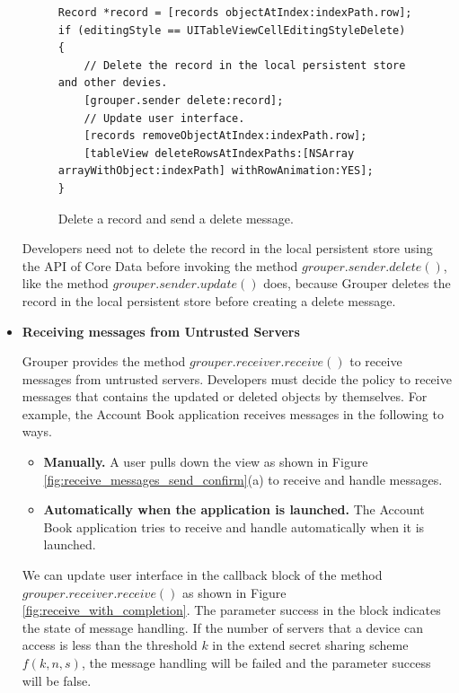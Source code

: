 \documentclass[a4paper,11pt]{report}
\begin{document}
\begin{itemize}
\begin{figure}
\begin{lstlisting}[frame=none language=Objective-C] 
Record *record = [records objectAtIndex:indexPath.row];
if (editingStyle == UITableViewCellEditingStyleDelete) {
    // Delete the record in the local persistent store and other devies.
    [grouper.sender delete:record];
    // Update user interface.
    [records removeObjectAtIndex:indexPath.row];
    [tableView deleteRowsAtIndexPaths:[NSArray arrayWithObject:indexPath] withRowAnimation:YES];
}	
\end{lstlisting}
\caption{Delete a record and send a delete message.}
\label{fig:delete_record}
\end{figure}

Developers need not to delete the record in the local persistent store using the API of Core Data before invoking the method $grouper.sender.delete()$,  like the method $grouper.sender.update()$ does, because Grouper deletes the record in the local persistent store before creating a delete message.
\\

\item \textbf{Receiving messages from Untrusted Servers}

Grouper provides the method $grouper.receiver.receive()$ to receive messages from untrusted servers.
Developers must decide the policy to receive messages that contains the updated or deleted objects by themselves.
For example, the Account Book application receives messages in the following to ways.

\begin{itemize}[leftmargin=7mm]
	\setlength{\itemsep}{1pt}
	\setlength{\parskip}{0pt}
	\setlength{\parsep}{0pt}
	\item \textbf{Manually.}
	A user pulls down the view as shown in Figure \ref{fig:receive_messages_send_confirm}(a) to receive and handle messages.
	\item \textbf{Automatically when the application is launched.} 
	The Account Book application tries to receive and handle automatically when it is launched.
\end{itemize}

We can update user interface in the callback block of the method $grouper.receiver.receive()$ as shown in Figure \ref{fig:receive_with_completion}.
The parameter success in the block indicates the state of message handling.
If the number of servers that a device can access is less than the threshold $k$ in the extend secret sharing scheme $f(k, n, s)$, the message handling will be failed and the parameter success will be false.


\end{itemize}
\end{document}
